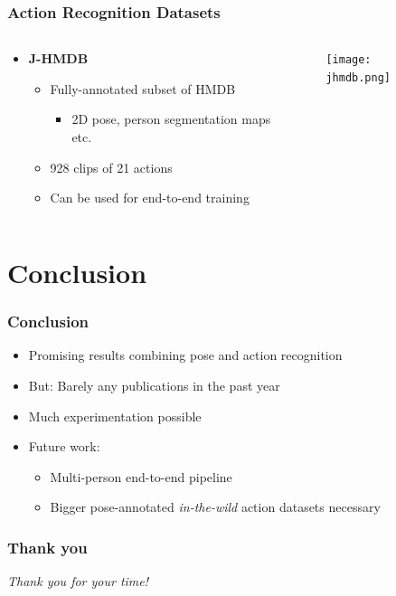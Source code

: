 \documentclass[9pt]{beamer}
\providecommand{\source}{\\ \footnotesize \tugreen{Source:} \footnotemark}
\newenvironment{myframe}[1][]{%
\begin{frame}%
\frametitle{#1}
\setcounter{footnote}{0}


}{%
\end{frame}%
}
\begin{document}
\begin{myframe}[Action Recognition Datasets]
  \begin{columns}[T]
      \begin{column}{.48\textwidth}
          \begin{itemize}
              \item \textbf{J-HMDB\footnotemark}
              \begin{itemize}
                  \item Fully-annotated subset of HMDB
                  \begin{itemize}
                      \item 2D pose, person segmentation maps etc.
                  \end{itemize}
                  \item 928 clips of 21 actions
                  \item Can be used for end-to-end training
              \end{itemize}
          \end{itemize}
      \end{column}
      \begin{column}{.48\textwidth}
          \begin{figure}
              \texttt{[image: jhmdb.png]}
              \centering
              \source
          \end{figure}
      \end{column}
  \end{columns}
\end{myframe}

\section{Conclusion}
\begin{myframe}[Conclusion]
    \begin{itemize}
        \item Promising results combining pose and action recognition
        \item But: Barely any publications in the past year
        \item Much experimentation possible
        \item Future work:
        \begin{itemize}
            \item Multi-person end-to-end pipeline
            \item Bigger pose-annotated \emph{in-the-wild} action datasets necessary
        \end{itemize}
    \end{itemize}
\end{myframe}

\begin{myframe}[Thank you]
    \centering \Large
    \emph{Thank you for your time!}
\end{myframe}
\end{document}
